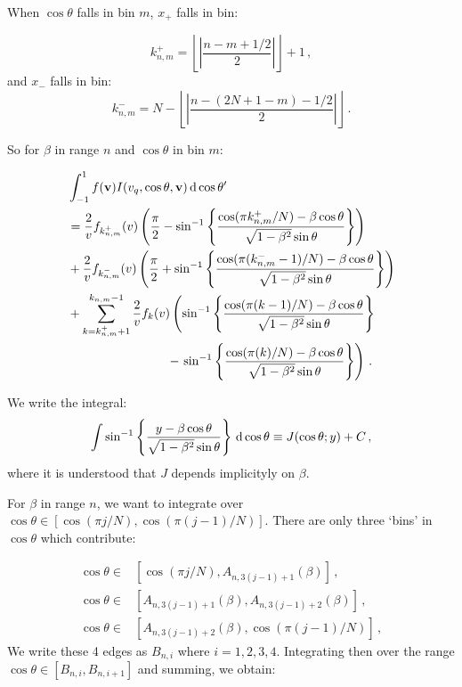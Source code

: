 
When $\cos\theta$ falls in bin $m$, $x_+$ falls in bin:

\begin{equation}
k^{+}_{n,m} = \left \lfloor{\left|\frac{n-m+1/2}{2}\right|}\right \rfloor + 1\,,
\end{equation}
and $x_-$ falls in bin:
\begin{equation}
k^{-}_{n,m} = N - \left \lfloor{\left|\frac{n-(2N+1 -m)-1/2}{2}\right|}\right \rfloor\,.
\end{equation}

So for $\beta$ in range $n$ and $\cos\theta$ in bin $m$:

\begin{align*}
& \int_{-1}^{1} f(\textbf{v}) I(v_q, \cos\theta, \textbf{v}) \, \mathrm{d}\cos\theta'\\
&= \frac{2}{v} f_{k_{n,m}^+}(v) \left( \frac{\pi}{2} - \sin^{-1}\left\{\frac{\cos(\pi k_{n,m}^{+}/N) - \beta \cos\theta}{\sqrt{1-\beta^2}\sin\theta}\right\}\right)\\
&+ \frac{2}{v} f_{k_{n,m}^-}(v) \left( \frac{\pi}{2} + \sin^{-1}\left\{\frac{\cos(\pi (k_{n,m}^{-}-1)/N) - \beta \cos\theta}{\sqrt{1-\beta^2}\sin\theta}\right\}\right)\\
&+ \sum_{k = k_{n,m}^+ +1}^{k_{n,m}-1} \frac{2}{v} f_{k}(v) \left( \sin^{-1}\left\{\frac{\cos(\pi (k-1)/N) - \beta \cos\theta}{\sqrt{1-\beta^2}\sin\theta}\right\}\right. \\
&\qquad\qquad\qquad\qquad- \left.\sin^{-1}\left\{\frac{\cos(\pi (k)/N) - \beta \cos\theta}{\sqrt{1-\beta^2}\sin\theta}\right\}\right)\,.
\end{align*}

We write the integral:
\begin{equation}
\int \sin^{-1}\left\{\frac{y - \beta \cos\theta}{\sqrt{1-\beta^2}\sin\theta}\right\} \, \mathrm{d}\cos\theta \equiv J(\cos\theta; y) + C\,,
\end{equation}
where it is understood that $J$ depends implicityly on $\beta$. 

For $\beta$ in range $n$, we want to integrate over $\cos\theta \in [\cos(\pi j/N), \cos(\pi (j-1)/N)]$. There are only three `bins' in $\cos\theta$ which contribute:

\begin{align*}
\cos\theta \in & [\cos(\pi j/N), A_{n,3(j-1)+1}(\beta)]\,, \\
\cos\theta \in & [A_{n,3(j-1)+1}(\beta), A_{n,3(j-1)+2}(\beta)]\,, \\
\cos\theta \in & [A_{n,3(j-1)+2}(\beta), \cos(\pi (j-1)/N)]\,,
\end{align*}
We write these 4 edges as $B_{n, i}$ where $i = 1,2,3,4$. Integrating then over the range $\cos\theta \in [B_{n,i}, B_{n,i+1}]$ and summing, we obtain:

